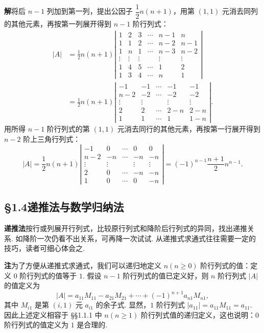 \documentclass[UTF8, 12pt, fontset=fandol, oneside]{ctexart}
\begin{document}
\noindent\textbf{解}\quad 将后 $n-1$ 列加到第一列，提出公因子 $\dfrac12 n(n+1)$，用第 $(1,1)$ 元消去同列的其他元素，再按第一列展开得到 $n-1$ 阶行列式：
\[
\begin{aligned}
|A|
&=\frac12 n(n+1)
\left|\begin{array}{cccccc}
1 & 2 & 3 & \cdots & n-1 & n\\
1 & 1 & 2 & \cdots & n-2 & n-1\\
1 & n & 1 & \cdots & n-3 & n-2\\
\vdots & \vdots & \vdots &        & \vdots & \vdots\\
1 & 4 & 5 & \cdots & 1 & 2\\
1 & 3 & 4 & \cdots & n & 1
\end{array}\right|\\
&=\frac12 n(n+1)
\left|\begin{array}{ccccc}
-1 & -1 & \cdots & -1 & -1\\
n-2 & -2 & \cdots & -2 & -2\\
\vdots & \vdots &        & \vdots & \vdots\\
2 & 2 & \cdots & 2-n & 2-n\\
1 & 1 & \cdots & 1 & 1-n
\end{array}\right|.
\end{aligned}
\]
用所得 $n-1$ 阶行列式的第 $(1,1)$ 元消去同行的其他元素，再按第一行展开得到 $n-2$ 阶上三角行列式：
\[
|A|
=\frac12 n(n+1)
\left|\begin{array}{ccccc}
-1 & 0 & \cdots & 0 & 0\\
n-2 & -n & \cdots & -n & -n\\
\vdots & \vdots &        & \vdots & \vdots\\
2 & 0 & \cdots & -n & -n\\
1 & 0 & \cdots & 0 & -n
\end{array}\right|
=(-1)^{n-1}\frac{n+1}{2}n^{n-1}.
\]

\subsection*{§1.4\quad 递推法与数学归纳法}

\noindent\textbf{递推法}\quad 按行或列展开行列式，比较原行列式和降阶后行列式的异同，找出递推关系. 如降阶一次仍看不出关系，可再降一次试试. 从递推式求通式往往需要一定的技巧，读者可细心体会之.

\noindent\textbf{注}\quad 为了方便从递推式求通式，我们可以递归地定义 $n(n\ge0)$ 阶行列式的值：定义 $0$ 阶行列式的值等于 $1$. 假设 $n-1$ 阶行列式的值已定义好，则 $n$ 阶行列式 $|A|$ 的值定义为
\[
|A|=a_{11}M_{11}-a_{21}M_{21}+\cdots+(-1)^{n+1}a_{n1}M_{n1},
\]
其中 $M_{i1}$ 是第 $(i,1)$ 元 $a_{i1}$ 的余子式. 显然，$1$ 阶行列式 $|a_{11}|=a_{11}M_{11}=a_{11}$. 因此上述定义相容于 §§1.1.1 中 $n(n\ge1)$ 阶行列式值的递归定义，这也说明：$0$ 阶行列式的值定义为 $1$ 是合理的.
\end{document}
